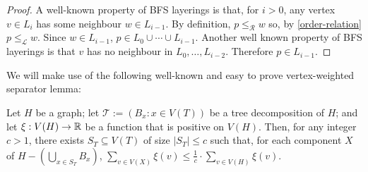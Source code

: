 \documentclass[kpfonts]{patmorin}
\theoremstyle{named}
\begin{document}
\begin{proof}
    A well-known property of BFS layerings is that, for $i>0$, any vertex $v\in L_{i}$ has some neighbour $w\in L_{i-1}$.  By definition, $p\le_\mathcal{R} w$ so, by \cref{order-relation} $p\le_\mathcal{L} w$. Since $w\in L_{i-1}$, $p\in L_0\cup\cdots\cup L_{i-1}$.  Another well known property of BFS layerings is that $v$ has no neighbour in $L_0,\ldots,L_{i-2}$.  Therefore $p\in L_{i-1}$.
\end{proof}

%
%
%
%

We will make use of the following well-known and easy to prove vertex-weighted separator lemma:

\begin{lem}\label{weighted-separator}
    Let $H$ be a graph; let $\mathcal{T}:=(B_x:x\in V(T))$ be a tree decomposition of $H$; and let $\xi:V(H)\to\mathbb{R}$ be a function that is positive on $V(H)$.  Then, for any integer $c>1$, there exists $S_T\subseteq V(T)$ of size $|S_T|\le c$ such that, for each component $X$ of $H-(\bigcup_{x\in S_T} B_x)$, $\sum_{v\in V(X)} \xi(v) \le \tfrac{1}{c}\cdot\sum_{v\in V(H)} \xi(v)$.
\end{lem}
\end{document}

